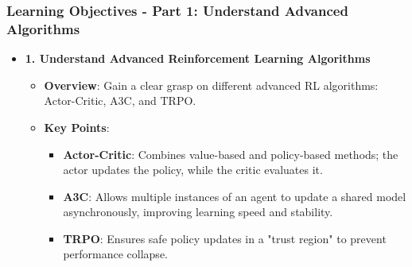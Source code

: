 \documentclass{beamer}
\begin{document}
\begin{frame}[fragile]
    \frametitle{Learning Objectives - Part 1: Understand Advanced Algorithms}
    \begin{itemize}
        \item \textbf{1. Understand Advanced Reinforcement Learning Algorithms}
        \begin{itemize}
            \item \textbf{Overview}: Gain a clear grasp on different advanced RL algorithms: Actor-Critic, A3C, and TRPO.
            \item \textbf{Key Points}:
            \begin{itemize}
                \item \textbf{Actor-Critic}: Combines value-based and policy-based methods; the actor updates the policy, while the critic evaluates it.
                \item \textbf{A3C}: Allows multiple instances of an agent to update a shared model asynchronously, improving learning speed and stability.
                \item \textbf{TRPO}: Ensures safe policy updates in a "trust region" to prevent performance collapse.
            \end{itemize}
        \end{itemize}
    \end{itemize}
\end{frame}
\end{document}
